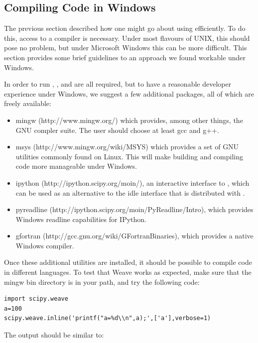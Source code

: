\documentclass[article]{jss}
\begin{document}
\subsection{Compiling Code in Windows}
\label{CompilingWindows}

The previous section described how one might go about using
 efficiently. To do this, access to a compiler is
necessary. Under most flavours of UNIX, this should pose no problem,
but under Microsoft Windows this can be more difficult. This section
provides some brief guidelines to an approach we found workable under
Windows.

In order to run , ,  and  are all required,
but to have a reasonable developer experience under Windows, we suggest
a few additional packages, all of which are freely available:
\begin{itemize}
\item mingw (http://www.mingw.org/) which provides, among other
  things, the GNU compler suite. The user should choose at least gcc and
  g++.
\item msys (http://www.mingw.org/wiki/MSYS) which provides a set of
  GNU utilities commonly found on Linux. This will make building and
  compiling code more manageable under Windows.
\item ipython (http://ipython.scipy.org/moin/), an interactive
  interface to , which can be used as an alternative
  to the idle interface that is distributed with .
\item pyreadline (http://ipython.scipy.org/moin/PyReadline/Intro),
  which provides Windows readline capabilities for IPython.
\item gfortran (http://gcc.gnu.org/wiki/GFortranBinaries), which provides a
  native Windows  compiler.
\end{itemize}
Once these additional utilities are installed, it should be possible
to compile code in different languages. To test that Weave works as
expected, make sure that the mingw bin directory is in your path, and
try the following code:


\begin{lstlisting}[basicstyle={\scriptsize}]
import scipy.weave 
a=100 
scipy.weave.inline('printf("a=%d\\n",a);',['a'],verbose=1)
\end{lstlisting}


The output should be similar to:
\end{document}

